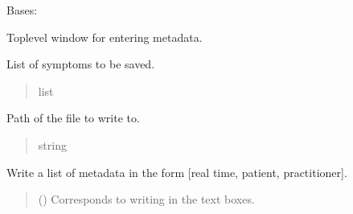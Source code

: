 \documentclass[letterpaper,10pt,english]{sphinxmanual}
\begin{document}
\begin{fulllineitems}
\label{\detokenize{frise:frise.save.MetaData_WD}}
\pysigstartsignatures
{}
\pysigstopsignatures
\sphinxAtStartPar
Bases: 

\sphinxAtStartPar
Toplevel window for entering metadata.

\begin{fulllineitems}
\label{\detokenize{frise:frise.save.MetaData_WD.liste}}
\pysigstartsignatures
{}
\pysigstopsignatures
\sphinxAtStartPar
List of symptoms to be saved.
\begin{quote}\begin{description}
\sphinxAtStartPar
list

\end{description}\end{quote}

\end{fulllineitems}


\begin{fulllineitems}
\label{\detokenize{frise:frise.save.MetaData_WD.filename}}
\pysigstartsignatures
{}
\pysigstopsignatures
\sphinxAtStartPar
Path of the file to write to.
\begin{quote}\begin{description}
\sphinxAtStartPar
string

\end{description}\end{quote}

\end{fulllineitems}


\begin{fulllineitems}
\label{\detokenize{frise:frise.save.MetaData_WD.get_metadata}}
\pysigstartsignatures
{}
\pysigstopsignatures
\sphinxAtStartPar
Write a list of metadata in the form {[}real time, patient, practitioner{]}.
\begin{quote}\begin{description}
\sphinxAtStartPar
{} () \textendash{} Corresponds to writing in the text boxes.


\end{description}
\end{quote}
\end{fulllineitems}
\end{fulllineitems}
\end{document}
